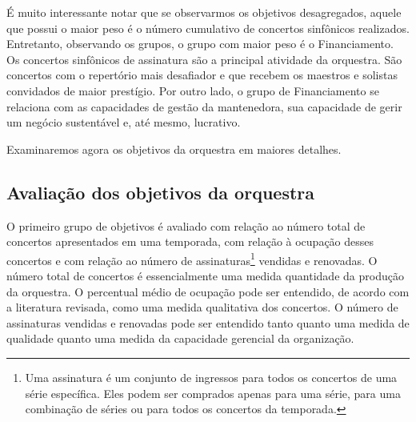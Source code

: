 \documentclass[a4paper, 12pt, openright, oneside, german, french, english, brazil]{abntex2}
\begin{document}
	É muito interessante notar que se observarmos os objetivos desagregados, aquele que possui o maior peso é o número cumulativo de concertos sinfônicos realizados. Entretanto, observando os grupos, o grupo com maior peso é o Financiamento. Os concertos sinfônicos de assinatura são a principal atividade da orquestra. São concertos com o repertório mais desafiador e que recebem os maestros e solistas convidados de maior prestígio. Por outro lado, o grupo de Financiamento se relaciona com as capacidades de gestão da mantenedora, sua capacidade de gerir um negócio sustentável e, até mesmo, lucrativo.
	
	Examinaremos agora os objetivos da orquestra em maiores detalhes.
	
	\subsection{Avaliação dos objetivos da orquestra}
	
	
	O primeiro grupo de objetivos é avaliado com relação ao número total de concertos apresentados em uma temporada, com relação à ocupação desses concertos e com relação ao número de assinaturas\footnote{Uma assinatura é um conjunto de ingressos para todos os concertos de uma série específica. Eles podem ser comprados apenas para uma série, para uma combinação de séries ou para todos os concertos da temporada.} vendidas e renovadas. O número total de concertos é essencialmente uma medida quantidade da produção da orquestra. O percentual médio de ocupação pode ser entendido, de acordo com a literatura revisada, como uma medida qualitativa dos concertos. O número de assinaturas vendidas e renovadas pode ser entendido tanto quanto uma medida de qualidade quanto uma medida da capacidade gerencial da organização.
	
\end{document}
